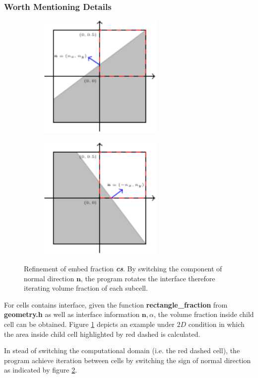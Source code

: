 \documentclass[a4paper]{article}
\newcommand{\func}[1]{\textbf{\textcolor{function}{#1}}}
\newcommand{\para}[1]{\textbf{\emph{\textcolor{para}{#1}}}}
\begin{document}
\subsubsection{Worth Mentioning Details}
\begin{figure}[h]
    \centering
    \begin{subfigure}[b]{0.45\textwidth}
        \centering
        \includegraphics[height=6cm]{image/fraction_refine2D1.pdf}
        \subcaption{}
        \label{fig:2Drefine1}
    \end{subfigure}
    \begin{subfigure}[b]{0.45\textwidth}
        \centering
        \includegraphics[height=6cm]{image/fraction_refine2D2.pdf}
        \subcaption{}
        \label{fig:2Drefine2}
    \end{subfigure}
    \caption{Refinement of embed fraction \para{cs}. By switching the component of normal direction $\mathbf{n}$, the program rotates the interface therefore iterating volume fraction of each subcell.}
    \label{fig:2Drefine}
\end{figure}
For cells contains interface, 
given the function \func{rectangle\_fraction} from \textbf{geometry.h} as well as interface information $\mathbf{n},\alpha$, the volume fraction inside child cell can be obtained. Figure \ref{fig:2Drefine1} depicts an example under $2D$ condition in which the area inside child cell highlighted by red dashed is calculated.\par
In stead of switching the computational domain (i.e. the red dashed cell), the program achieve iteration between cells by switching the sign of normal direction as indicated by figure \ref{fig:2Drefine2}.
\end{document}
